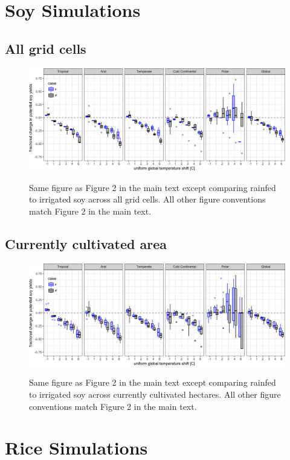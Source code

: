 \documentclass[10pt]{article}
\begin{document}
\section{Soy Simulations}
\subsection{All grid cells}
\begin{figure}[h!]
\includegraphics[width=\textwidth]{s_soy_sim_CG.png}\\
\caption{Same figure as Figure 2 in the main text except comparing rainfed to irrigated soy across all grid cells. All other figure conventions match Figure 2 in the main text.}
\label{fig:maizeCG}
\end{figure}

\subsection{Currently cultivated area}
\begin{figure}[h!]
\includegraphics[width=\textwidth]{s_soy_sim_CG_area_weight.png}\\
\caption{Same figure as Figure 2 in the main text except comparing rainfed to irrigated soy across currently cultivated hectares. All other figure conventions match Figure 2 in the main text.}
\label{fig:maizeCG}
\end{figure}

\clearpage
\section{Rice Simulations}
\end{document}
